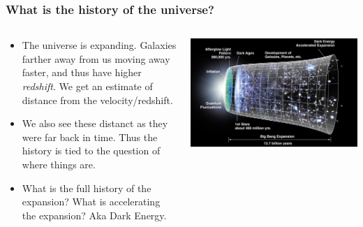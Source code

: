 \documentclass{beamer}
\begin{document}
\frame
{

    \frametitle{What is the history of the universe?}


    \begin{columns}
        \begin{column}{0.5\textwidth}
            \begin{itemize}


                \item The universe is expanding.  Galaxies farther away from
                    us moving away faster, and thus have higher {\em redshift}.
                    We get an estimate of distance from the velocity/redshift.
                    
                \item We also see these distanct as they were far back in time.
                    Thus the history is tied to the question of where things
                    are.

                \item What is the full history of the expansion?  What is
                    accelerating the expansion? Aka Dark Energy.


            \end{itemize}
        \end{column}
        \begin{column}{0.5\textwidth}
            \begin{center}
                \includegraphics[width=\textwidth]{CMB_Timeline300_no_WMAP.jpg}
            \end{center}
            
        \end{column}
    \end{columns}


}
\end{document}
